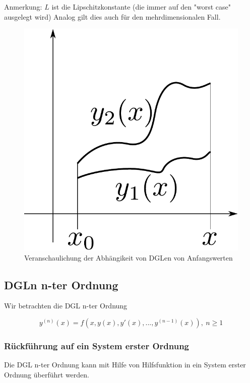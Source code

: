 \documentclass[10pt,a4paper]{article}
\begin{document}
Anmerkung:
$L$ ist die Lipschitzkonstante (die immer auf den "worst case" ausgelegt wird)
Analog gilt dies auch für den mehrdimensionalen Fall.

\begin{figure}[H]
\centering
\includegraphics[width=\textwidth]{images/dependence_on_startvalues.pdf}
\caption{Veranschaulichung der Abhängikeit von DGLen von Anfangswerten}
\end{figure}


\subsection{DGLn n-ter Ordnung}

Wir betrachten die DGL n-ter Ordnung 

\begin{equation}
y^{(n)}(x)=f(x,y(x),y'(x),...,y^{(n-1)}(x)) , ~ n \geq 1
\end{equation}

\subsubsection{Rückführung auf ein System erster Ordnung}

Die DGL n-ter Ordnung kann mit Hilfe von Hilfsfunktion in ein System erster Ordnung überführt werden.
\end{document}
